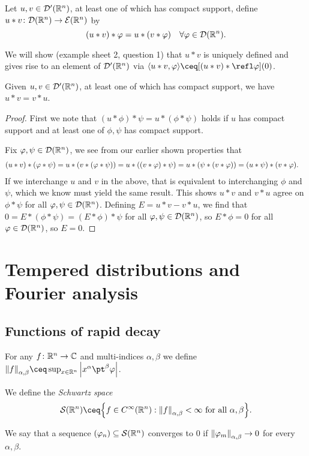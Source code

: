 \begin{definition}
	Let $u, v \in \mathcal D'(\mathbb R^n)$, at least one of which has compact support, define $u * v \colon \mathcal D(\mathbb R^n) \to \mathcal E(\mathbb R^n)$ by
	\[
	(u * v) * \varphi = u * (v * \varphi) \quad \forall \varphi \in \mathcal D(\mathbb R^n). 
	\]
\end{definition}
We will show (example sheet 2, question 1) that $u * v$ is uniquely defined and gives rise to an element of $\mathcal D'(\mathbb R^n)$ via $\ang{u * v, \phi} \ceq [(u * v) * \refl\phi](0)$. 

\begin{lemma}
	Given $u, v \in \mathcal D'(\mathbb R^n)$, at least one of which has compact support, we have $u * v = v * u$. 
\end{lemma}

\begin{proof}
	First we note that $(u * \phi) * \psi = u * (\phi * \psi)$ holds if $u$ has compact support and at least one of $\phi, \psi$ has compact support. 
	
	Fix $\varphi, \psi \in \mathcal D(\mathbb R^n)$, we see from our earlier shown properties that 
	\begin{align*}
	(u * v) * (\varphi * \psi) &= u * \qty(v * (\varphi * \psi)) = u * ((v * \varphi) * \psi) = u * (\psi * (v * \varphi)) = (u * \psi) * (v * \varphi).
	\end{align*}
	If we interchange $u$ and $v$ in the above, that is equivalent to interchanging $\phi$ and $\psi$, which we know must yield the same result. This shows $u * v$ and $v * u$ agree on $\phi * \psi$ for all $\varphi, \psi \in \mathcal D(\mathbb R^n)$. Defining $E = u * v - v * u$, we find that $0 = E * (\phi * \psi) = (E * \phi) * \psi$ for all $\varphi, \psi \in \mathcal D(\mathbb R^n)$, so $E * \phi = 0$ for all $\varphi \in \mathcal D(\mathbb R^n)$, so $E = 0$. 
\end{proof}

\section{Tempered distributions and Fourier analysis}
\subsection{Functions of rapid decay}
\begin{definition}
	For any $f \colon \mathbb R^n \to \mathbb C$ and multi-indices $\alpha, \beta$ we define $\norm{f}_{\alpha, \beta} \ceq \sup_{x \in \RR^n} \abs{x^\alpha \pt^\beta\phi}$. 
	
	We define the \emph{Schwartz space}
	\[
	\Cal S(\RR^n) \ceq \qty{f \in C^\infty(\RR^n) : \norm{f}_{\alpha, \beta} < \infty \text{ for all $\alpha, \beta$}}.
	\]
	
	We say that a sequence $(\varphi_n) \subseteq \mathcal S(\mathbb R^n)$ converges to 0 if $\norm{\varphi_m}_{\alpha, \beta} \to 0$ for every $\alpha, \beta$.  
\end{definition}

